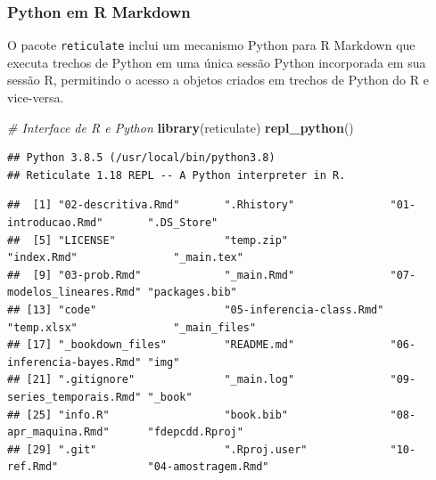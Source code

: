 \documentclass[
]{book}
\newenvironment{Shaded}{\begin{snugshade}}{\end{snugshade}}
\newcommand{\CommentTok}[1]{\textcolor[rgb]{0.56,0.35,0.01}{\textit{#1}}}
\newcommand{\KeywordTok}[1]{\textcolor[rgb]{0.13,0.29,0.53}{\textbf{#1}}}
\newcommand{\NormalTok}[1]{#1}
\newcommand{\OperatorTok}[1]{\textcolor[rgb]{0.81,0.36,0.00}{\textbf{#1}}}
\newcommand{\StringTok}[1]{\textcolor[rgb]{0.31,0.60,0.02}{#1}}
\theoremstyle{definition}
\theoremstyle{definition}
\theoremstyle{definition}
\theoremstyle{remark}
\begin{document}
\hypertarget{python-em-r-markdown}{%
\subsubsection*{Python em R Markdown}\label{python-em-r-markdown}}

O pacote \texttt{reticulate} inclui um mecanismo Python para R Markdown que executa trechos de Python em uma única sessão Python incorporada em sua sessão R, permitindo o acesso a objetos criados em trechos de Python do R e vice-versa.

\begin{Shaded}
\begin{Highlighting}[]
\CommentTok{\# Interface de R e Python}
\KeywordTok{library}\NormalTok{(reticulate)}
\KeywordTok{repl\_python}\NormalTok{() }
\end{Highlighting}
\end{Shaded}

\begin{verbatim}
## Python 3.8.5 (/usr/local/bin/python3.8)
## Reticulate 1.18 REPL -- A Python interpreter in R.
\end{verbatim}

\begin{Shaded}
\end{Shaded}

\begin{verbatim}
##  [1] "02-descritiva.Rmd"       ".Rhistory"               "01-introducao.Rmd"       ".DS_Store"              
##  [5] "LICENSE"                 "temp.zip"                "index.Rmd"               "_main.tex"              
##  [9] "03-prob.Rmd"             "_main.Rmd"               "07-modelos_lineares.Rmd" "packages.bib"           
## [13] "code"                    "05-inferencia-class.Rmd" "temp.xlsx"               "_main_files"            
## [17] "_bookdown_files"         "README.md"               "06-inferencia-bayes.Rmd" "img"                    
## [21] ".gitignore"              "_main.log"               "09-series_temporais.Rmd" "_book"                  
## [25] "info.R"                  "book.bib"                "08-apr_maquina.Rmd"      "fdepcdd.Rproj"          
## [29] ".git"                    ".Rproj.user"             "10-ref.Rmd"              "04-amostragem.Rmd"
\end{verbatim}
\end{document}
